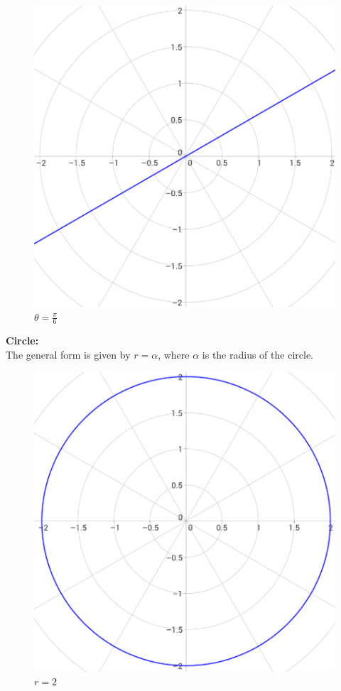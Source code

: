         \begin{figure} [hbt!]
            \centering
            \includegraphics[scale=0.4]{Resources/Unit3Vectors/line.PNG}
            \caption*{$\theta=\frac{\pi}{6}$}
        \end{figure}

        \noindent \textbf{Circle:} \\
        The general form is given by $r=\alpha$, where $\alpha$ is the radius of the circle. \\

        \begin{figure} [hbt!]
            \centering
            \includegraphics[scale=0.4]{Resources/Unit3Vectors/circle.PNG}
            \caption*{$r=2$}
        \end{figure}

